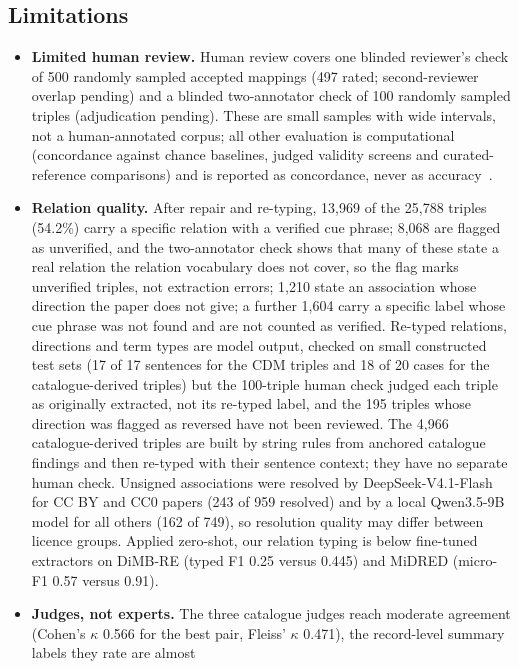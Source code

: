 \documentclass[referee,lineno,pdflatex,sn-vancouver-num]{sn-jnl}
\theoremstyle{thmstyleone}%
\theoremstyle{thmstyletwo}%
\theoremstyle{thmstylethree}%
\begin{document}
\subsection{Limitations}\label{sec:limitations}
\begin{itemize}
\item \textbf{Limited human review.} Human review covers one blinded
reviewer's check of 500 randomly sampled accepted mappings (497 rated; second-reviewer
overlap pending) and a blinded two-annotator check of 100 randomly sampled
triples (adjudication pending). These are small samples with wide intervals,
not a human-annotated corpus; all other evaluation is computational (concordance
against chance baselines, judged validity screens and curated-reference
comparisons) and is reported as concordance, never as
accuracy~\cite{chen2025llmbench}.
\item \textbf{Relation quality.} After repair and re-typing,
13{,}969 of the 25{,}788 triples (54.2\%) carry a specific relation with
a verified cue phrase; 8{,}068 are flagged as unverified, and the
two-annotator check shows that many of these state a real relation the
relation vocabulary does not cover, so the flag marks unverified triples, not
extraction errors; 1{,}210
state an association whose direction the paper does not give; a further
1{,}604 carry a specific label whose cue phrase was not found and are not
counted as verified. Re-typed relations, directions and term types are model
output, checked on small constructed test sets (17 of 17 sentences for the
CDM triples and 18 of 20 cases for the catalogue-derived triples) but the 100-triple human check judged each triple as originally extracted,
not its re-typed label, and the 195 triples
whose direction was flagged as reversed have not been reviewed. The 4{,}966
catalogue-derived triples are built by string rules from anchored catalogue
findings and then re-typed with their sentence context; they have no
separate human check. Unsigned associations were resolved by
DeepSeek-V4.1-Flash for CC BY and CC0 papers (243 of 959 resolved) and by a
local Qwen3.5-9B model for all others (162 of 749), so resolution quality may differ between licence groups. Applied zero-shot,
our relation typing is below fine-tuned extractors on DiMB-RE (typed F1 0.25
versus 0.445) and MiDRED (micro-F1 0.57 versus 0.91).
\item \textbf{Judges, not experts.} The three catalogue judges reach
moderate agreement (Cohen's $\kappa$ 0.566 for the best pair, Fleiss'
$\kappa$ 0.471), the record-level summary labels they rate are almost

\end{itemize}
\end{document}

